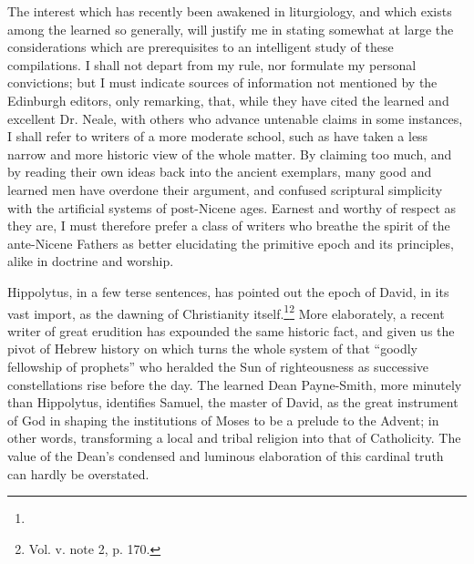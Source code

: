The interest which has recently been awakened in liturgiology, and which exists among the learned so generally, will justify me in stating somewhat at large the considerations which are prerequisites to an intelligent study of these compilations. I shall not depart from my rule, nor formulate my personal convictions; but I must indicate sources of information not mentioned by the Edinburgh editors, only remarking, that, while they have cited the learned and excellent Dr. Neale, with others who advance untenable claims in some instances, I shall refer to writers of a more moderate school, such as have taken a less narrow and more historic view of the whole matter. By claiming too much, and by reading their own ideas back into the ancient exemplars, many good and learned men have overdone their argument, and confused scriptural simplicity with the artificial systems of post-Nicene ages. Earnest and worthy of respect as they are, I must therefore prefer a class of writers who breathe the spirit of the ante-Nicene Fathers as better elucidating the primitive epoch and its principles, alike in doctrine and worship.

Hippolytus, in a few terse sentences, has pointed out the epoch of David, in its vast import, as the dawning of Christianity itself.\footnote{}\footnote{\par  Vol. v. note 2, p. 170.} More elaborately, a recent writer of great erudition has expounded the same historic fact, and given us the pivot of Hebrew history on which turns the whole system of that “goodly fellowship of prophets” who heralded the Sun of righteousness as successive constellations rise before the day. The learned Dean Payne-Smith, more minutely than Hippolytus, identifies Samuel, the master of David, as the great instrument of God in shaping the institutions of Moses to be a prelude to the Advent; in other words, transforming a local and tribal religion into that of Catholicity. The value of the Dean’s condensed and luminous elaboration of this cardinal truth can hardly be overstated.


